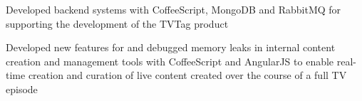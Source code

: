\begin{job}

  \item Developed backend systems with CoffeeScript, MongoDB and RabbitMQ for
  supporting the development of the TVTag product
  \item Developed new features for and debugged memory leaks in internal content
  creation and management tools with CoffeeScript and AngularJS to enable
  real-time creation and curation of live content created over the course of a
  full TV episode
\end{job}
